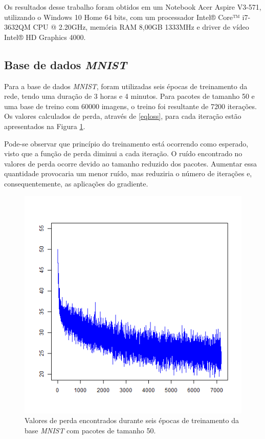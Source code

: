 \documentclass[conference]{IEEEtran}
\begin{document}
Os resultados desse trabalho foram obtidos em um Notebook Acer Aspire V3-571, utilizando o Windows 10 Home 64 bits, com um processador Intel® Core™ i7-3632QM CPU @ 2.20GHz, memória RAM 8,00GB 1333MHz e driver de vídeo Intel® HD Graphics 4000.

\subsection{Base de dados \textit{MNIST}} \label{result:mnist}

Para a base de dados \textit{MNIST}, foram utilizadas seis épocas de treinamento da rede, tendo uma duração de 3 horas e 4 minutos. Para pacotes de tamanho 50 e uma base de treino com 60000 imagens, o treino foi resultante de 7200 iterações. Os valores calculados de perda, através de \eqref{eqloss}, para cada iteração estão apresentados na Figura \ref{figlmnist}.

Pode-se observar que princípio do treinamento está ocorrendo como esperado, visto que a função de perda diminui a cada iteração. O ruído encontrado no valores de perda ocorre devido ao tamanho reduzido dos pacotes. Aumentar essa quantidade provocaria um menor ruído, mas reduziria o número de iterações e, consequentemente, as aplicações do gradiente.

\begin{figure}[b]
\centerline{\includegraphics[width=.8\columnwidth]{fig/L_mnist.png}}
\caption{Valores de perda encontrados durante seis épocas de treinamento da base \textit{MNIST} com pacotes de tamanho 50.}
\label{figlmnist}
\end{figure}
\end{document}
